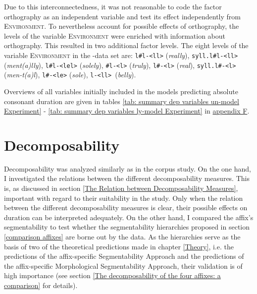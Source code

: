  Due to this interconnectedness, it was not reasonable to code the factor orthography as an independent variable and test its effect independently from \textsc{Environment}. 
 To nevertheless account for possible effects of orthography, the levels of the variable \textsc{Environment} were enriched with information about orthography. 
This resulted in two additional factor levels.
   The eight levels of the variable \textsc{Environment} in the -data set are: \texttt{l\#l-<ll>} (\textit{really}), \texttt{syll.l\#l-<ll>} (\textit{ment(a)lly}), \texttt{l\#l-<lel>} (\textit{solely}), \texttt{\#l-<l>} (\textit{truly}), \texttt{l\#-<l>} (\textit{real}), \texttt{syll.l\#-<l>} (\textit{men-t(a)l}),  \texttt{l\#-<le>} (\textit{sole}), \texttt{l-<ll> }(\textit{belly}). 		

Overviews of all variables initially included in the models predicting absolute consonant duration are given in tables \ref{tab: summary dep variables un-model Experiment} - \ref{tab: summary dep variables ly-model Experiment} in \hyperref[Appendix F Summaries of variables in initial models of experimental study]{appendix F}.



\section{Decomposability} \label{decomposability experiment}


 

Decomposability was analyzed similarly as in the corpus study. On the one hand, I investigated the relations between the different decomposability measures. This is, as discussed in section \ref{The Relation between Decomposability Measures}, important with regard to their suitability in the study. Only when the relation between the different decomposability measures is clear, their possible effects on duration can be interpreted adequately.  
On the other hand, I compared the affix's segmentability to test whether the segmentability hierarchies proposed in section \ref{comparison affixes} are borne out by the data.  As the hierarchies serve as the basis of two of the theoretical predictions made in chapter \ref{Theory}, i.e. the predictions of the affix-specific Segmentability Approach and the predictions of the affix-specific Morphological Segmentability Approach, their validation is of high importance (see section \ref{The decomposability of the four affixes: a comparison} for details). 




